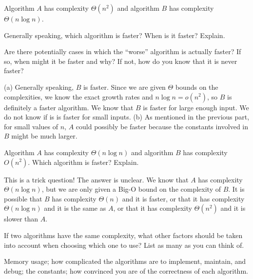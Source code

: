 \begin{requ}
Algorithm $A$ has complexity $\Theta(n^2)$ and algorithm $B$ has complexity $\Theta(n\log n)$.
\begin{lenum}
\item Generally speaking, which algorithm is faster? When is it faster? Explain.
\item Are there potentially cases in which the ``worse'' algorithm is actually faster? 
If so, when might it be faster and why? If not, how do you know that it is never faster? 
\end{lenum}
\begin{requanswer}
(a) Generally speaking, $B$ is faster. Since we are given $\Theta$ bounds on the complexities, we know
the exact growth rates and $n\log n = o(n^2)$, so $B$ is definitely a faster algorithm. 
We know that $B$ is faster for large enough input. We do not know if is is faster for small inputs.
(b) As mentioned in the previous part, for small values of $n$, $A$ could possibly be faster because the
constants involved in $B$ might be much larger.
\end{requanswer}
\end{requ}

\begin{requ}
Algorithm $A$ has complexity $\Theta(n\log n)$ and algorithm $B$ has complexity $O(n^2)$.
Which algorithm is faster? Explain.
\begin{requanswer}
This is a trick question! The answer is unclear. We know that $A$ has complexity $\Theta(n\log n)$, but
we are only given a Big-O bound on the complexity of $B$. It is possible that $B$ has complexity
$\Theta(n)$ and it is faster, or that it has complexity $\Theta(n\log n)$ and it is the same as $A$,
or that it has complexity $\Theta(n^2)$ and it is slower than $A$.
\end{requanswer}
\end{requ}

\begin{requ}
If two algorithms have the same complexity, what other factors should be taken into account when choosing which
one to use? List as many as you can think of.
\begin{requanswer}
Memory usage; 
how complicated the algorithms are to implement, maintain, and debug; 
the constants; how convinced you are of the correctness of each algorithm.
\end{requanswer}
\end{requ}

